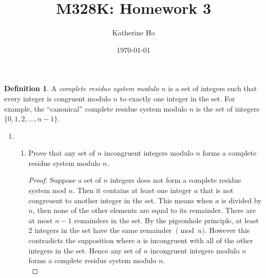 \documentclass[11pt]{article}
\title{M328K: Homework 3}
\author{Katherine Ho}
\date\today
\theoremstyle{definition}
\newtheorem*{defn*}{Definition}
\begin{document}
\maketitle

\begin{defn*}
    A \emph{complete residue system modulo $n$} is a set of integers such that every integer is congruent modulo $n$ to exactly one integer in the set. For example, the ``canonical'' complete residue system modulo $n$ is the set of integers $\{0,1,2,\dots,n-1\}$.
\end{defn*}

\begin{enumerate}
    \item 
    \begin{enumerate}
        \item Prove that any set of $n$ incongruent integers modulo $n$ forms a complete residue system modulo $n$.
        \begin{proof}
            Suppose a set of $n$ integers does not form a complete residue system mod $n$. 
            Then it contains at least one integer $a$ that is not congreuent to another integer in the set.
            This means when $a$ is divided by $n$, then none of the other elements are equal to its remainder.
            There are at most $n-1$ remainders in the set. By the pigeonhole principle, at least 2 
            integers in the set have the same remainder $\pmod{n}$. However this contradicts the supposition 
            where $a$ is incongruent with all of the other integers in the set. Hence any set of $n$ incongruent 
            integers modulo $n$ forms a complete residue system modulo $n$. \\
        \end{proof}
        

\end{enumerate}
\end{enumerate}
\end{document}

